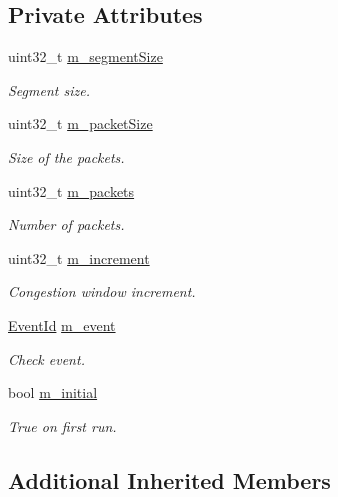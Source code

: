 \subsection*{Private Attributes}
\begin{DoxyCompactItemize}
\item 
uint32\+\_\+t \hyperlink{classTcpNewRenoCongAvoidNormalTest_a14e4dce9b59a6456f26c2736a38bf0ff}{m\+\_\+segment\+Size}
\begin{DoxyCompactList}\small\item\em Segment size. \end{DoxyCompactList}\item 
uint32\+\_\+t \hyperlink{classTcpNewRenoCongAvoidNormalTest_af4fe88e11da0557e15a7021f872d1d43}{m\+\_\+packet\+Size}
\begin{DoxyCompactList}\small\item\em Size of the packets. \end{DoxyCompactList}\item 
uint32\+\_\+t \hyperlink{classTcpNewRenoCongAvoidNormalTest_a38dd5d011a9182374fb97d4b1c7f6f40}{m\+\_\+packets}
\begin{DoxyCompactList}\small\item\em Number of packets. \end{DoxyCompactList}\item 
uint32\+\_\+t \hyperlink{classTcpNewRenoCongAvoidNormalTest_afa604a36a9752799d7936bdcab789d22}{m\+\_\+increment}
\begin{DoxyCompactList}\small\item\em Congestion window increment. \end{DoxyCompactList}\item 
\hyperlink{classns3_1_1EventId}{Event\+Id} \hyperlink{classTcpNewRenoCongAvoidNormalTest_a3f5819f49950c4480eaa3fe14b6352c9}{m\+\_\+event}
\begin{DoxyCompactList}\small\item\em Check event. \end{DoxyCompactList}\item 
bool \hyperlink{classTcpNewRenoCongAvoidNormalTest_a8ece8465d12b8ffe9f8353dce1c727c9}{m\+\_\+initial}
\begin{DoxyCompactList}\small\item\em True on first run. \end{DoxyCompactList}\end{DoxyCompactItemize}
\subsection*{Additional Inherited Members}


